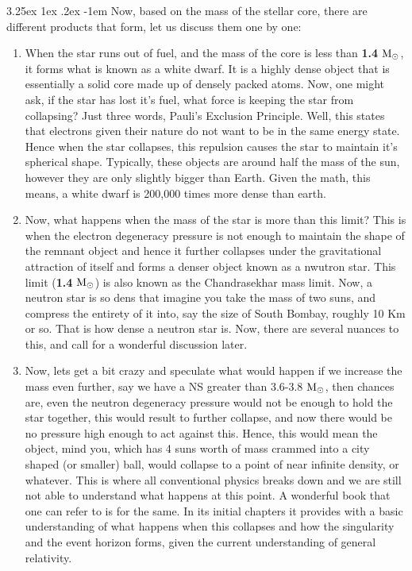 \documentclass[a4paper,twoside,11pt]{article}
\makeatletter
\numberwithin{equation}{section}
\newcommand{\solmas}{\(\textup{M}_\odot\)}
\renewcommand\paragraph{\@startsection{paragraph}{5}{\z@}%
  {3.25ex \@plus1ex \@minus.2ex}%
  {-1em}%
  {\normalfont\normalsize\bfseries}}
\makeatother
\begin{document}
\paragraph{}
Now, based on the mass of the stellar core, there are different products that form, let us discuss them one by one:
\begin{enumerate}
    \item When the star runs out of fuel, and the mass of the core is less than \textbf{1.4} \solmas, it forms what is known as a white dwarf. It is a highly dense object that is essentially a solid core made up of densely packed atoms. Now, one might ask, if the star has lost it's fuel, what force is keeping the star from collapsing? Just three words, Pauli's Exclusion Principle. Well, this states that electrons given their nature do not want to be in the same energy state. Hence when the star collapses, this repulsion causes the star to maintain it's spherical shape. Typically, these objects are around half the mass of the sun, however they are only slightly bigger than Earth. Given the math, this means, a white dwarf is 200,000 times more dense than earth. 
    \item Now, what happens when the mass of the star is more than this limit? This is when the electron degeneracy pressure is not enough to maintain the shape of the remnant object and hence it further collapses under the gravitational attraction of itself and forms a denser object known as a nwutron star. This limit (\textbf{1.4} \solmas) is also known as the Chandrasekhar mass limit. Now, a neutron star is so dens that imagine you take the mass of two suns, and compress the entirety of it into, say the size of South Bombay, roughly 10 Km or so. That is how dense a neutron star is. Now, there are several nuances to this, and call for a wonderful discussion later. 
    \item Now, lets get a bit crazy and speculate what would happen if we increase the mass even further, say we have a NS greater than 3.6-3.8 \solmas, then chances are, even the neutron degeneracy pressure would not be enough to hold the star together, this would result to further collapse, and now there would be no pressure high enough to act against this. Hence, this would mean the object, mind you, which has 4 suns worth of mass crammed into a city shaped (or smaller) ball, would collapse to a point of near infinite density, or whatever. This is where all conventional physics breaks down and we are still not able to understand what happens at this point. A wonderful book that one can refer to is \cite{Joshi1} for the same. In its initial chapters it provides with a basic understanding of what happens when this collapses and how the singularity and the event horizon forms, given the current understanding of general relativity. 
\end{enumerate}
\end{document}
